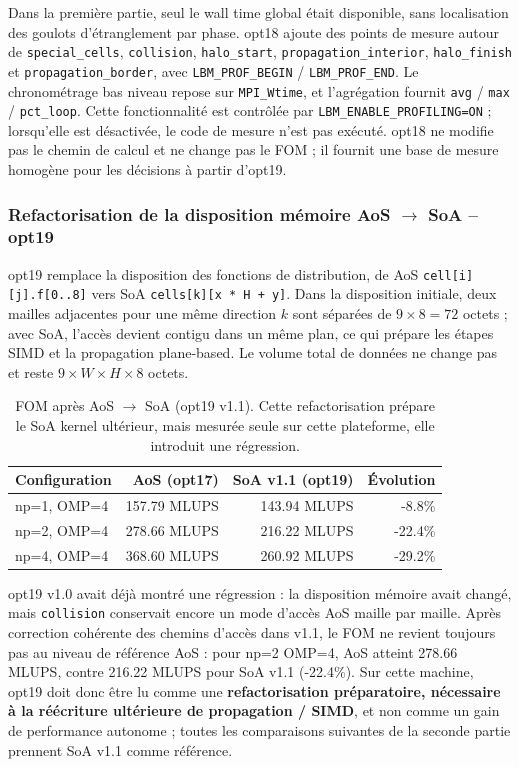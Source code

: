 \documentclass[a4paper,11pt,oneside]{report}
\newcommand{\code}[1]{\texttt{#1}}
\begin{document}
Dans la première partie, seul le wall time global était disponible, sans localisation des goulots d'étranglement par phase. opt18 ajoute des points de mesure autour de
\code{special\_cells}, \code{collision}, \code{halo\_start},
\code{propagation\_interior}, \code{halo\_finish} et
\code{propagation\_border}, avec \code{LBM\_PROF\_BEGIN} / \code{LBM\_PROF\_END}. Le chronométrage bas niveau repose sur \code{MPI\_Wtime}, et l'agrégation fournit \code{avg} / \code{max} / \code{pct\_loop}.
Cette fonctionnalité est contrôlée par \code{LBM\_ENABLE\_PROFILING=ON} ; lorsqu'elle est désactivée, le code de mesure n'est pas exécuté.
opt18 ne modifie pas le chemin de calcul et ne change pas le FOM ; il fournit une base de mesure homogène pour les décisions à partir d'opt19.

\subsubsection{Refactorisation de la disposition mémoire AoS $\to$ SoA -- opt19}

opt19 remplace la disposition des fonctions de distribution, de AoS \code{cell[i][j].f[0..8]} vers SoA
\code{cells[k][x * H + y]}. Dans la disposition initiale, deux mailles adjacentes pour une même direction $k$ sont séparées de
$9 \times 8 = 72$ octets ; avec SoA, l'accès devient contigu dans un même plan, ce qui prépare les étapes SIMD et la propagation plane-based. Le volume total de données ne change pas et reste
$9 \times W \times H \times 8$ octets.

\begin{table}[H]
\centering
\begin{tabular}{@{}lrrr@{}}
\toprule
\textbf{Configuration} & \textbf{AoS (opt17)} & \textbf{SoA v1.1 (opt19)} & \textbf{Évolution} \\
\midrule
np=1, OMP=4 & 157.79 MLUPS & 143.94 MLUPS & -8.8\% \\
np=2, OMP=4 & 278.66 MLUPS & 216.22 MLUPS & -22.4\% \\
np=4, OMP=4 & 368.60 MLUPS & 260.92 MLUPS & -29.2\% \\
\bottomrule
\end{tabular}
\caption{FOM après AoS $\to$ SoA (opt19 v1.1). Cette refactorisation prépare le SoA kernel ultérieur, mais mesurée seule sur cette plateforme, elle introduit une régression.}
\end{table}

opt19 v1.0 avait déjà montré une régression : la disposition mémoire avait changé, mais \code{collision} conservait encore un mode d'accès AoS maille par maille.
Après correction cohérente des chemins d'accès dans v1.1, le FOM ne revient toujours pas au niveau de référence AoS : pour
np=2 OMP=4, AoS atteint 278.66 MLUPS, contre 216.22 MLUPS pour SoA v1.1
(-22.4\%). Sur cette machine, opt19 doit donc être lu comme une \textbf{refactorisation préparatoire, nécessaire à la réécriture ultérieure de propagation / SIMD}, et non comme un gain de performance autonome ; toutes les comparaisons suivantes de la seconde partie prennent
SoA v1.1 comme référence.
\end{document}
